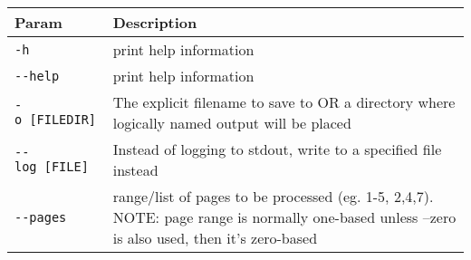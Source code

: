 \documentclass[
]{article}
\begin{document}
\begin{longtable}[]{@{}ll@{}}
\toprule
\begin{minipage}[b]{0.47\columnwidth}\raggedright
Param\strut
\end{minipage} & \begin{minipage}[b]{0.47\columnwidth}\raggedright
Description\strut
\end{minipage}\tabularnewline
\midrule
\endhead
\begin{minipage}[t]{0.47\columnwidth}\raggedright
\texttt{-h}\strut
\end{minipage} & \begin{minipage}[t]{0.47\columnwidth}\raggedright
print help information\strut
\end{minipage}\tabularnewline
\begin{minipage}[t]{0.47\columnwidth}\raggedright
\texttt{-\/-help}\strut
\end{minipage} & \begin{minipage}[t]{0.47\columnwidth}\raggedright
print help information\strut
\end{minipage}\tabularnewline
\begin{minipage}[t]{0.47\columnwidth}\raggedright
\texttt{-o\ {[}FILE\textbar{}DIR{]}}\strut
\end{minipage} & \begin{minipage}[t]{0.47\columnwidth}\raggedright
The explicit filename to save to OR a directory where logically named
output will be placed\strut
\end{minipage}\tabularnewline
\begin{minipage}[t]{0.47\columnwidth}\raggedright
\texttt{-\/-log\ {[}FILE{]}}\strut
\end{minipage} & \begin{minipage}[t]{0.47\columnwidth}\raggedright
Instead of logging to stdout, write to a specified file instead\strut
\end{minipage}\tabularnewline
\begin{minipage}[t]{0.47\columnwidth}\raggedright
\texttt{-\/-pages}\strut
\end{minipage} & \begin{minipage}[t]{0.47\columnwidth}\raggedright
range/list of pages to be processed (eg. 1-5, 2,4,7). NOTE: page range
is normally one-based unless --zero is also used, then it's
zero-based\strut
\end{minipage}\tabularnewline
\bottomrule
\end{longtable}
\end{document}
